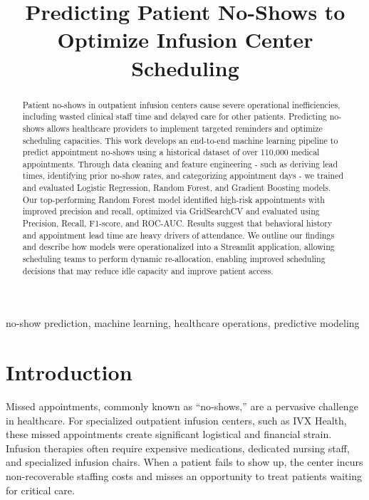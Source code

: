 \documentclass[conference]{IEEEtran}
\begin{document}
\title{Predicting Patient No-Shows to Optimize Infusion Center Scheduling}

\author{
}

\maketitle

\begin{abstract}
Patient no-shows in outpatient infusion centers cause severe operational inefficiencies, including wasted clinical staff time and delayed care for other patients. Predicting no-shows allows healthcare providers to implement targeted reminders and optimize scheduling capacities. This work develops an end-to-end machine learning pipeline to predict appointment no-shows using a historical dataset of over 110,000 medical appointments. Through data cleaning and feature engineering - such as deriving lead times, identifying prior no-show rates, and categorizing appointment days - we trained and evaluated Logistic Regression, Random Forest, and Gradient Boosting models. Our top-performing Random Forest model identified high-risk appointments with improved precision and recall, optimized via GridSearchCV and evaluated using Precision, Recall, F1-score, and ROC-AUC. Results suggest that behavioral history and appointment lead time are heavy drivers of attendance. We outline our findings and describe how models were operationalized into a Streamlit application, allowing scheduling teams to perform dynamic re-allocation, enabling improved scheduling decisions that may reduce idle capacity and improve patient access.
\end{abstract}

\begin{IEEEkeywords}
no-show prediction, machine learning, healthcare operations, predictive modeling
\end{IEEEkeywords}

\section{Introduction}
Missed appointments, commonly known as ``no-shows,'' are a pervasive challenge in healthcare. For specialized outpatient infusion centers, such as IVX Health, these missed appointments create significant logistical and financial strain. Infusion therapies often require expensive medications, dedicated nursing staff, and specialized infusion chairs. When a patient fails to show up, the center incurs non-recoverable staffing costs and misses an opportunity to treat patients waiting for critical care.
\end{document}
